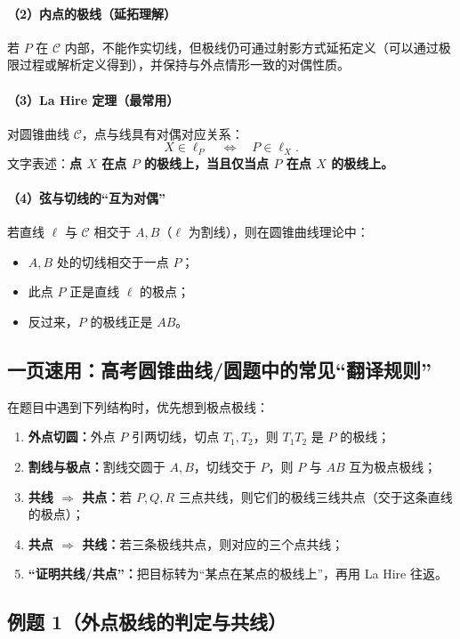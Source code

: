 \documentclass[UTF8]{ctexart}
\begin{document}
	\paragraph{（2）内点的极线（延拓理解）}
	若 $P$ 在 $\mathcal{C}$ 内部，不能作实切线，但极线仍可通过射影方式延拓定义（可以通过极限过程或解析定义得到），并保持与外点情形一致的对偶性质。
	
	\paragraph{（3）La Hire 定理（最常用）}
	对圆锥曲线 $\mathcal{C}$，点与线具有对偶对应关系：
	\[
	X\in \ell_P \quad \Longleftrightarrow \quad P\in \ell_X.
	\]
	文字表述：\textbf{点 $X$ 在点 $P$ 的极线上，当且仅当点 $P$ 在点 $X$ 的极线上。}
	
	\paragraph{（4）弦与切线的“互为对偶”}
	若直线 $\ell$ 与 $\mathcal{C}$ 相交于 $A,B$（$\ell$ 为割线），则在圆锥曲线理论中：
	\begin{itemize}
		\item $A,B$ 处的切线相交于一点 $P$；
		\item 此点 $P$ 正是直线 $\ell$ 的极点；
		\item 反过来，$P$ 的极线正是 $AB$。
	\end{itemize}
	
	\subsection{一页速用：高考圆锥曲线/圆题中的常见“翻译规则”}
	在题目中遇到下列结构时，优先想到极点极线：
	\begin{enumerate}
		\item \textbf{外点切圆：}外点 $P$ 引两切线，切点 $T_1,T_2$，则 $T_1T_2$ 是 $P$ 的极线；
		\item \textbf{割线与极点：}割线交圆于 $A,B$，切线交于 $P$，则 $P$ 与 $AB$ 互为极点极线；
		\item \textbf{共线 $\Rightarrow$ 共点：}若 $P,Q,R$ 三点共线，则它们的极线三线共点（交于这条直线的极点）；
		\item \textbf{共点 $\Rightarrow$ 共线：}若三条极线共点，则对应的三个点共线；
		\item \textbf{“证明共线/共点”：}把目标转为“某点在某点的极线上”，再用 La Hire 往返。
	\end{enumerate}
	
	\subsection{例题 1（外点极线的判定与共线）}
\end{document}
